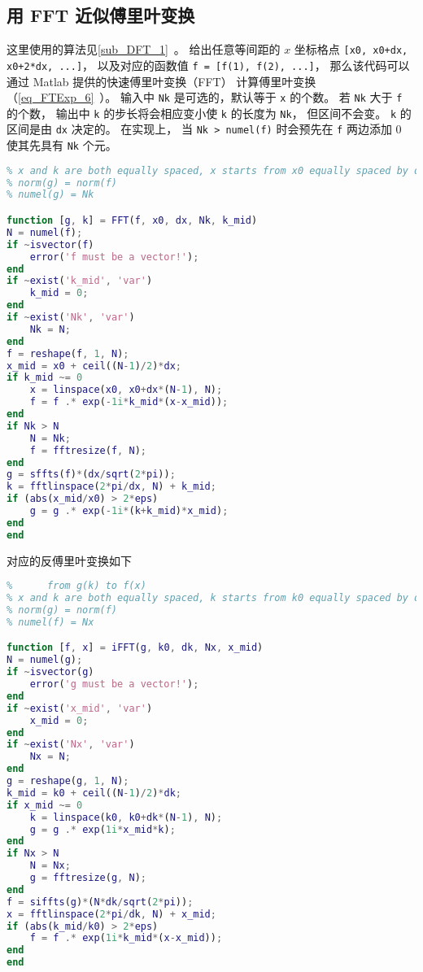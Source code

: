 \subsection{用 FFT 近似傅里叶变换}
这里使用的算法见\autoref{sub_DFT_1}~。 给出任意等间距的 $x$ 坐标格点 \verb|[x0, x0+dx, x0+2*dx, ...]|， 以及对应的函数值 \verb|f = [f(1), f(2), ...]|， 那么该代码可以通过 Matlab 提供的快速傅里叶变换（FFT） 计算傅里叶变换（\autoref{eq_FTExp_6}~）。 输入中 \verb|Nk| 是可选的，默认等于 \verb|x| 的个数。 若 \verb|Nk| 大于 \verb|f| 的个数， 输出中 \verb|k| 的步长将会相应变小使 \verb|k| 的长度为 \verb|Nk|， 但区间不会变。 \verb|k| 的区间是由 \verb|dx| 决定的。 在实现上， 当 \verb|Nk > numel(f)| 时会预先在 \verb|f| 两边添加 0 使其先具有 \verb|Nk| 个元。
\begin{lstlisting}[language=matlab, caption=FFT.m]
% fft approximation of the analytical fourier transform from f(x) to g(k)
% x and k are both equally spaced, x starts from x0 equally spaced by dx
% norm(g) = norm(f)
% numel(g) = Nk

function [g, k] = FFT(f, x0, dx, Nk, k_mid)
N = numel(f);
if ~isvector(f)
    error('f must be a vector!');
end
if ~exist('k_mid', 'var')
    k_mid = 0;
end
if ~exist('Nk', 'var')
    Nk = N;
end
f = reshape(f, 1, N);
x_mid = x0 + ceil((N-1)/2)*dx;
if k_mid ~= 0
    x = linspace(x0, x0+dx*(N-1), N);
    f = f .* exp(-1i*k_mid*(x-x_mid));
end
if Nk > N
    N = Nk;
    f = fftresize(f, N);
end
g = sffts(f)*(dx/sqrt(2*pi));
k = fftlinspace(2*pi/dx, N) + k_mid;
if (abs(x_mid/x0) > 2*eps)
    g = g .* exp(-1i*(k+k_mid)*x_mid);
end
end
\end{lstlisting}
对应的反傅里叶变换如下
\begin{lstlisting}[language=matlab, caption=iFFT.m]
% ifft approximation of the analytical inverse Fourier transform
%      from g(k) to f(x)
% x and k are both equally spaced, k starts from k0 equally spaced by dk
% norm(g) = norm(f)
% numel(f) = Nx

function [f, x] = iFFT(g, k0, dk, Nx, x_mid)
N = numel(g);
if ~isvector(g)
    error('g must be a vector!');
end
if ~exist('x_mid', 'var')
    x_mid = 0;
end
if ~exist('Nx', 'var')
    Nx = N;
end
g = reshape(g, 1, N);
k_mid = k0 + ceil((N-1)/2)*dk;
if x_mid ~= 0
    k = linspace(k0, k0+dk*(N-1), N);
    g = g .* exp(1i*x_mid*k);
end
if Nx > N
    N = Nx;
    g = fftresize(g, N);
end
f = siffts(g)*(N*dk/sqrt(2*pi));
x = fftlinspace(2*pi/dk, N) + x_mid;
if (abs(k_mid/k0) > 2*eps)
    f = f .* exp(1i*k_mid*(x-x_mid));
end
end
\end{lstlisting}

